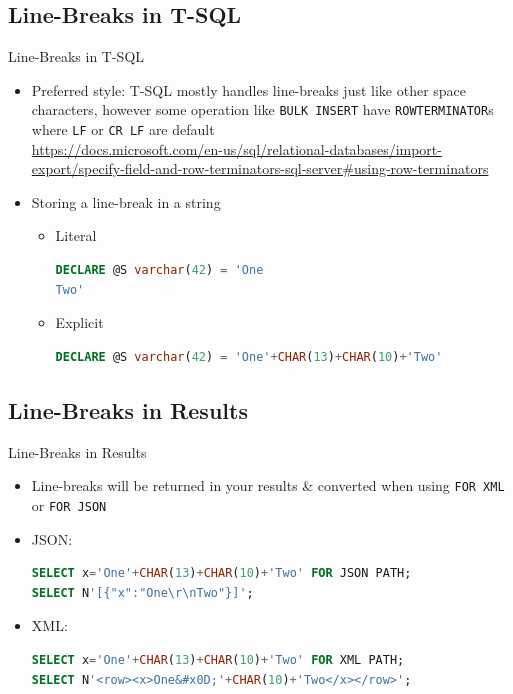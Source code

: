 \documentclass[english,aspectratio=169]{beamer}
\begin{document}
\subsection{Line-Breaks in T-SQL}
\begin{frame}[fragile]{Line-Breaks in T-SQL}
\begin{itemize}
\item Preferred style: T-SQL mostly handles line-breaks just like other space characters, however some operation like \texttt{BULK INSERT} have \texttt{ROWTERMINATOR}s where \texttt{LF} or \texttt{CR LF} are default\\
    \url{https://docs.microsoft.com/en-us/sql/relational-databases/import-export/specify-field-and-row-terminators-sql-server#using-row-terminators}
\item Storing a line-break in a string
    \begin{itemize}
    \item Literal \begin{lstlisting}[language=SQL]
DECLARE @S varchar(42) = 'One
Two'
    \end{lstlisting}
    \item Explicit \begin{lstlisting}[language=SQL]
DECLARE @S varchar(42) = 'One'+CHAR(13)+CHAR(10)+'Two'
    \end{lstlisting}
    \end{itemize}
\end{itemize}
\end{frame}

\subsection{Line-Breaks in Results}
\begin{frame}[fragile]{Line-Breaks in Results}
\begin{itemize}
    \item Line-breaks will be returned in your results \& converted when using \texttt{FOR XML} or \texttt{FOR JSON}
    \item JSON: \begin{lstlisting}[language=SQL]
SELECT x='One'+CHAR(13)+CHAR(10)+'Two' FOR JSON PATH;
SELECT N'[{"x":"One\r\nTwo"}]';
    \end{lstlisting}
    \item XML: \begin{lstlisting}[language=SQL]
SELECT x='One'+CHAR(13)+CHAR(10)+'Two' FOR XML PATH;
SELECT N'<row><x>One&#x0D;'+CHAR(10)+'Two</x></row>';
    \end{lstlisting}
\end{itemize}
\end{frame}
\end{document}
